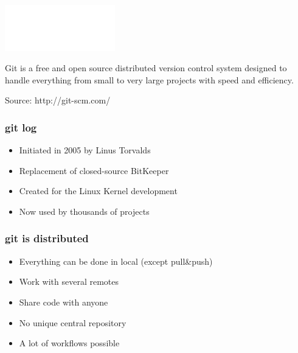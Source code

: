 \begin{frame}
    \begin{center}
        \includegraphics[height=2cm]{git.png}
    \end{center}
    \begin{center}
        Git is a free and open source distributed version control system designed to handle everything from small to very large projects with speed and efficiency.
    \end{center}
    \begin{flushright}
        Source: http://git-scm.com/
    \end{flushright}
\end{frame}
\begin{frame}
    \frametitle{git log}
    \begin{itemize}
        \item{Initiated in 2005 by Linus Torvalds}
        \item{Replacement of closed-source BitKeeper}
        \item{Created for the Linux Kernel development}
        \item{Now used by thousands of projects}
    \end{itemize}
\end{frame}
\begin{frame}
    \frametitle{git is distributed}
    \begin{itemize}
        \item Everything can be done in local (except pull\&push)
        \item Work with several remotes
        \item Share code with anyone
        \item No unique central repository
        \item A lot of workflows possible
    \end{itemize}
\end{frame}

